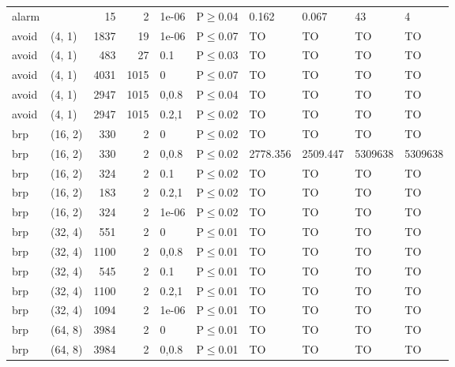 \begin{longtable}{llrrllllll}
 alarm         &           &     	15 &    2 & 1e-06 & P$\geq$0.04  & 0.162    & 0.067    & 43      & 4       \\
 avoid         & (4, 1)    &   	1837 &   19 & 1e-06 & P$\leq$0.07  & TO       & TO       & TO      & TO      \\
 avoid         & (4, 1)    &    	483 &   27 & 0.1   & P$\leq$0.03  & TO       & TO       & TO      & TO      \\
 avoid         & (4, 1)    &   	4031 & 1015 & 0     & P$\leq$0.07  & TO       & TO       & TO      & TO      \\
 avoid         & (4, 1)    &   	2947 & 1015 & 0,0.8 & P$\leq$0.04  & TO       & TO       & TO      & TO      \\
 avoid         & (4, 1)    &   	2947 & 1015 & 0.2,1 & P$\leq$0.02  & TO       & TO       & TO      & TO      \\
 brp           & (16, 2)   &    	330 &    2 & 0     & P$\leq$0.02  & TO       & TO       & TO      & TO      \\
 brp           & (16, 2)   &    	330 &    2 & 0,0.8 & P$\leq$0.02  & 2778.356 & 2509.447 & 5309638 & 5309638 \\
 brp           & (16, 2)   &    	324 &    2 & 0.1   & P$\leq$0.02  & TO       & TO       & TO      & TO      \\
 brp           & (16, 2)   &    	183 &    2 & 0.2,1 & P$\leq$0.02  & TO       & TO       & TO      & TO      \\
 brp           & (16, 2)   &    	324 &    2 & 1e-06 & P$\leq$0.02  & TO       & TO       & TO      & TO      \\
 brp           & (32, 4)   &    	551 &    2 & 0     & P$\leq$0.01  & TO       & TO       & TO      & TO      \\
 brp           & (32, 4)   &   	1100 &    2 & 0,0.8 & P$\leq$0.01  & TO       & TO       & TO      & TO      \\
 brp           & (32, 4)   &    	545 &    2 & 0.1   & P$\leq$0.01  & TO       & TO       & TO      & TO      \\
 brp           & (32, 4)   &   	1100 &    2 & 0.2,1 & P$\leq$0.01  & TO       & TO       & TO      & TO      \\
 brp           & (32, 4)   &   	1094 &    2 & 1e-06 & P$\leq$0.01  & TO       & TO       & TO      & TO      \\
 brp           & (64, 8)   &   	3984 &    2 & 0     & P$\leq$0.01  & TO       & TO       & TO      & TO      \\
 brp           & (64, 8)   &   	3984 &    2 & 0,0.8 & P$\leq$0.01  & TO       & TO       & TO      & TO      \\

\end{longtable}
